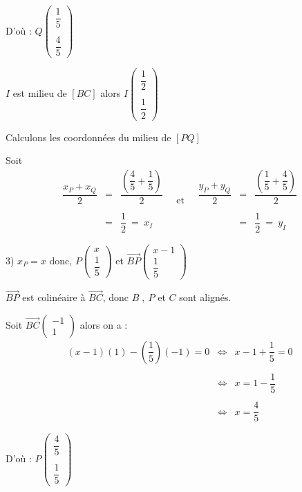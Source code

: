 \documentclass[12pt]{article}
\begin{document}
D'où  : $Q\begin{pmatrix}\dfrac{1}{5} \\ \\ \dfrac{4}{5}\end{pmatrix}$

$I$ est milieu de $[BC]$ alors $I\begin{pmatrix}\dfrac{1}{2} \\ \\ \dfrac{1}{2}\end{pmatrix}$

Calculons les coordonnées du milieu de $[PQ]$

Soit $$\begin{array}{ccc}\dfrac{x_{P}+x_{Q}}{2}&=&\dfrac{\left(\dfrac{4}{5}+\dfrac{1}{5}\right)}{2} \\ \\ &=&\dfrac{1}{2}\ =\ x_{I} \end{array}\quad\text{et}\quad\begin{array}{ccc}\dfrac{y_{P}+y_{Q}}{2}&=&\dfrac{\left(\dfrac{1}{5}+\dfrac{4}{5}\right)}{2} \\ \\ &=&\dfrac{1}{2}\ =\ y_{I} \end{array}$$

3) $x_{P}=x$ donc, $P\begin{pmatrix} x \\ \dfrac{1}{5}\end{pmatrix}$ et $\overrightarrow{BP}\begin{pmatrix} x-1 \\ \dfrac{1}{5}\end{pmatrix}$

$\overrightarrow{BP}$ est colinéaire à $\overrightarrow{BC}$, donc $B\;,\ P$ et $C$ sont alignés.

Soit $\overrightarrow{BC}\begin{pmatrix} -1 \\ 1\end{pmatrix}$ alors on a : $$\begin{array}{rcl} (x-1)(1)-\left(\dfrac{1}{5}\right)(-1)=0&\Leftrightarrow&x-1+\dfrac{1}{5}=0\\\\&\Leftrightarrow&x=1-\dfrac{1}{5}\\ \\&\Leftrightarrow&x=\dfrac{4}{5}\end{array}$$

D'où  : $P\begin{pmatrix}\dfrac{4}{5} \\ \\ \dfrac{1}{5}\end{pmatrix}$
\end{document}
